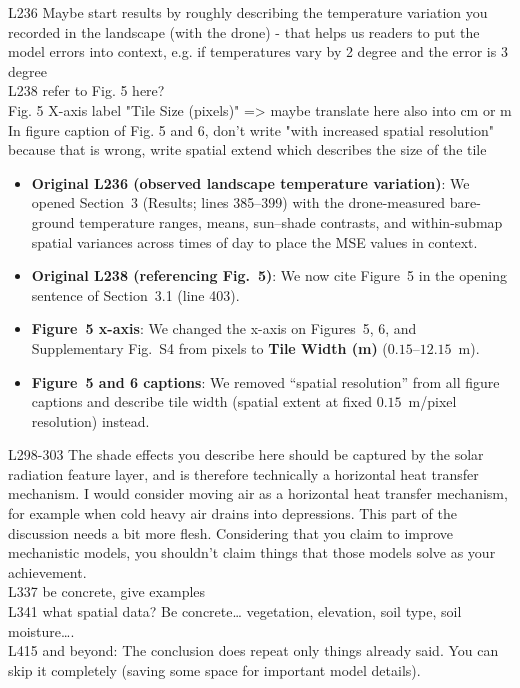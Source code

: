 \documentclass[12pt,english]{reviewresponse}
\begin{document}
\begin{revcomment}
L236 Maybe start results by roughly describing the temperature variation you recorded in the landscape (with the drone) - that helps us readers to put the model errors into context, e.g. if temperatures vary by 2 degree and the error is 3 degree\\
L238 refer to Fig. 5 here?\\
Fig. 5 X-axis label "Tile Size (pixels)" => maybe translate here also into cm or m\\
In figure caption of Fig. 5 and 6, don't write "with increased spatial resolution" because that is wrong, write spatial extend which describes the size of the tile
\end{revcomment}

\begin{revresponse}
\begin{itemize}[leftmargin=*, itemsep=0.2em]
    \item \textbf{Original L236 (observed landscape temperature variation)}: We opened Section~3 (Results; lines 385--399) with the drone-measured bare-ground temperature ranges, means, sun--shade contrasts, and within-submap spatial variances across times of day to place the MSE values in context.
    \item \textbf{Original L238 (referencing Fig.~5)}: We now cite Figure~5 in the opening sentence of Section~3.1 (line 403).
    \item \textbf{Figure~5 x-axis}: We changed the x-axis on Figures~5, 6, and Supplementary Fig.~S4 from pixels to \textbf{Tile Width (m)} ($0.15\text{--}12.15$~m).
    \item \textbf{Figure~5 and 6 captions}: We removed ``spatial resolution'' from all figure captions and describe tile width (spatial extent at fixed $0.15$~m/pixel resolution) instead.
\end{itemize}
\end{revresponse}

\begin{revcomment}
L298-303 The shade effects you describe here should be captured by the solar radiation feature layer, and is therefore technically a horizontal heat transfer mechanism. I would consider moving air as a horizontal heat transfer mechanism, for example when cold heavy air drains into depressions. This part of the discussion needs a bit more flesh. Considering that you claim to improve mechanistic models, you shouldn't claim things that those models solve as your achievement.\\
L337 be concrete, give examples\\
L341 what spatial data? Be concrete… vegetation, elevation, soil type, soil moisture….\\
L415 and beyond: The conclusion does repeat only things already said. You can skip it completely (saving some space for important model details).
\end{revcomment}
\end{document}
